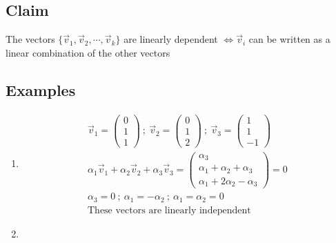 \documentclass[a4paper, 11pt, normalem]{report}
\begin{document}
\subsection{Claim}
The vectors $\{\vec{v}_{1},\vec{v}_{2},\cdots,\vec{v}_{k}\}$ are linearly dependent $\iff \vec{v}_{i}$ can be written as a linear combination of the other vectors

\subsection{Examples}
\begin{enumerate}
    \item   \begin{gather*}
                \vec{v}_{1} =
                \begin{pmatrix}
                    0 \\
                    1 \\
                    1
                \end{pmatrix}
                ~;~
                \vec{v}_{2} =
                \begin{pmatrix}
                    0 \\
                    1 \\
                    2
                \end{pmatrix}
                ~;~
                \vec{v}_{3} =
                \begin{pmatrix}
                    1 \\
                    1 \\
                    -1
                \end{pmatrix} \\
                \alpha_{1}\vec{v}_{1} + \alpha_{2}\vec{v}_{2} + \alpha_{3}\vec{v}_{3} =
                \begin{pmatrix}
                    \alpha_{3} \\
                    \alpha_{1} + \alpha_{2} + \alpha_{3} \\
                    \alpha_{1} + 2\alpha_{2} - \alpha_{3}
                \end{pmatrix} = 0 \\
                \alpha_{3} = 0 ~;~ \alpha_{1} = -\alpha_{2} ~;~ \alpha_{1} = \alpha_{2} = 0 \\
                \text{These vectors are linearly independent}
            \end{gather*}
    \item   \begin{gather*}

\end{gather*}
\end{enumerate}
\end{document}
